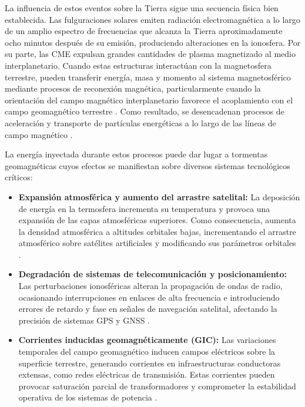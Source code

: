 La influencia de estos eventos sobre la Tierra sigue una secuencia física bien establecida. Las fulguraciones solares emiten radiación electromagnética a lo largo de un amplio espectro de frecuencias que alcanza la Tierra aproximadamente ocho minutos después de su emisión, produciendo alteraciones en la ionosfera. Por su parte, las CME expulsan grandes cantidades de plasma magnetizado al medio interplanetario. Cuando estas estructuras interactúan con la magnetosfera terrestre, pueden transferir energía, masa y momento al sistema magnetosférico mediante procesos de reconexión magnética, particularmente cuando la orientación del campo magnético interplanetario favorece el acoplamiento con el campo geomagnético terrestre \citep{spaceaustralia2026}. Como resultado, se desencadenan procesos de aceleración y transporte de partículas energéticas a lo largo de las líneas de campo magnético \citep{reyes2021geomagnetic}.

La energía inyectada durante estos procesos puede dar lugar a tormentas geomagnéticas cuyos efectos se manifiestan sobre diversos sistemas tecnológicos críticos:

\begin{itemize}
\item \textbf{Expansión atmosférica y aumento del arrastre satelital:} La deposición de energía en la termosfera incrementa su temperatura y provoca una expansión de las capas atmosféricas superiores. Como consecuencia, aumenta la densidad atmosférica a altitudes orbitales bajas, incrementando el arrastre atmosférico sobre satélites artificiales y modificando sus parámetros orbitales \citep{spaceaustralia2026}.

\item \textbf{Degradación de sistemas de telecomunicación y posicionamiento:} Las perturbaciones ionosféricas alteran la propagación de ondas de radio, ocasionando interrupciones en enlaces de alta frecuencia e introduciendo errores de retardo y fase en señales de navegación satelital, afectando la precisión de sistemas GPS y GNSS \citep{spaceaustralia2026,grodji2021study}.

\item \textbf{Corrientes inducidas geomagnéticamente (GIC):} Las variaciones temporales del campo geomagnético inducen campos eléctricos sobre la superficie terrestre, generando corrientes en infraestructuras conductoras extensas, como redes eléctricas de transmisión. Estas corrientes pueden provocar saturación parcial de transformadores y comprometer la estabilidad operativa de los sistemas de potencia \citep{spaceaustralia2026}.

\end{itemize}


